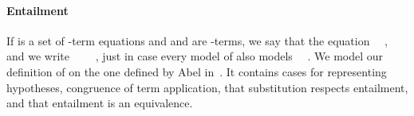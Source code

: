 \paragraph*{Entailment}

If  is a set of -term equations and  and  are -terms,
we say that   the equation ~~, and we write
~~~~, just in case every model of  also models
~~.
We model our definition of  on the one defined by Abel
in~\cite{Abel:2021}.  It contains cases for representing hypotheses, congruence of term
application, that substitution respects entailment, and that entailment is
an equivalence.

\begin{code}%
\>[0]\<%
\\
\>[0]\AgdaSpace{}%
%
\>[14]\AgdaSymbol{(}\AgdaSpace{}%
\AgdaSymbol{:}\AgdaSpace{}%
\AgdaSymbol{\{}\AgdaSpace{}%
\AgdaSymbol{:}\AgdaSpace{}%
\AgdaSpace{}%
\AgdaSymbol{\}}\AgdaSpace{}%
\AgdaSpace{}%
\AgdaSymbol{(}\AgdaSpace{}%
\AgdaSpace{}%
\AgdaSpace{}%
\AgdaSpace{}%
\AgdaSymbol{)}\AgdaSpace{}%
\AgdaSymbol{(}\AgdaSpace{}%
\AgdaSymbol{))}\AgdaSpace{}%
\AgdaSymbol{:}\<%
\\
%
\>[14]\AgdaSymbol{(}\AgdaSpace{}%
\AgdaSymbol{:}\AgdaSpace{}%
\AgdaSpace{}%
\AgdaSymbol{)(}\AgdaSpace{}%
\AgdaSpace{}%
\AgdaSymbol{:}\AgdaSpace{}%
\AgdaSpace{}%
\AgdaSymbol{)}\AgdaSpace{}%
\AgdaSpace{}%
\AgdaSpace{}%
\AgdaSymbol{(}\AgdaSpace{}%
\AgdaSymbol{)}\AgdaSpace{}%
\<%
\\
%
\\[\AgdaEmptyExtraSkip]%
\>[0][@{}l@{\AgdaIndent{0}}]%
\>[1]%
\>[13]\AgdaSymbol{:}%
\>[16]\AgdaSymbol{\}\{}\AgdaSpace{}%
\AgdaSpace{}%
\AgdaSymbol{:}\AgdaSpace{}%
\AgdaSpace{}%
\AgdaSymbol{\}}\AgdaSpace{}%
\AgdaSpace{}%
\AgdaSymbol{(}\AgdaSpace{}%

\end{code}
